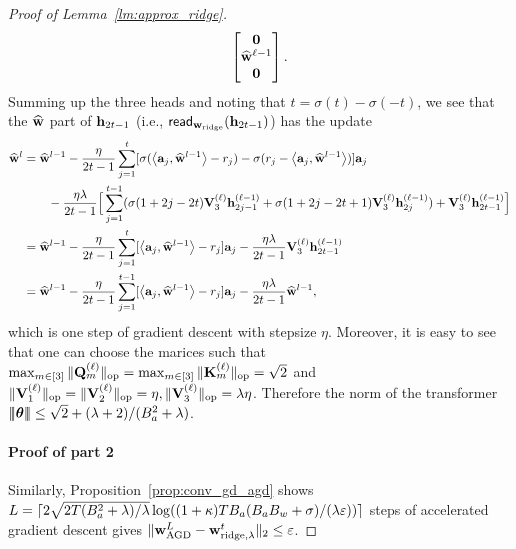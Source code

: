 \begin{proof}[Proof of Lemma~\ref{lm:approx_ridge}]
\begin{align*}
\begin{bmatrix}
        {\mathbf 0}\\ \widehat{{\mathbf w}}^{\ell-1}\\ {\mathbf 0}
    \end{bmatrix}.
\end{align*}
Summing up the three heads and noting that $t=\sigma(t)-\sigma(-t)$, we see that the $\widehat{{\mathbf w}}$ part of ${\mathbf h}_{2t-1}$ (i.e., ${\sf read}_{{\mathbf w}_{\rm ridge}}({\mathbf h}_{2t-1})$) has the update
\begin{align*}
    \widehat{{\mathbf w}}^{l}
    &=\widehat{{\mathbf w}}^{l-1}-\frac{\eta}{2t-1}\sum_{j=1}^t[\sigma(\left\langle{\mathbf a}_j,\widehat{{\mathbf w}}^{l-1}\right\rangle-r_j)-\sigma(r_j-\left\langle{\mathbf a}_j,\widehat{{\mathbf w}}^{l-1}\right\rangle)]{\mathbf a}_j\\&
    \qquad
    -\frac{\eta\lambda}{2t-1}\Big[\sum_{j=1}^{t-1}(\sigma(1+2j-2t){\mathbf V}_3^{(\ell)}{\mathbf h}^{(\ell-1)}_{2j-1}+\sigma(1+2j-2t+1){\mathbf V}_3^{(\ell)}{\mathbf h}^{(\ell-1)}_{2j})+
   {\mathbf V}_3^{(\ell)}{\mathbf h}^{(\ell-1)}_{2t-1}\Big]\\
     &=\widehat{{\mathbf w}}^{l-1}-\frac{\eta}{2t-1}\sum_{j=1}^t[\left\langle{\mathbf a}_j,\widehat{{\mathbf w}}^{l-1}\right\rangle-r_j]{\mathbf a}_j-\frac{\eta\lambda}{2t-1}{\mathbf V}_3^{(\ell)}{\mathbf h}^{(\ell-1)}_{2t-1}\\
     &=\widehat{{\mathbf w}}^{l-1}-\frac{\eta}{2t-1}\sum_{j=1}^{t-1}[\left\langle{\mathbf a}_j,\widehat{{\mathbf w}}^{l-1}\right\rangle-r_j]{\mathbf a}_j-\frac{\eta\lambda}{2t-1}\widehat{{\mathbf w}}^{l-1},
\end{align*}
which is one step of gradient descent with stepsize $\eta$.  Moreover, it is easy to see that one can choose the marices such that $\max_{m\in[3]}\|{{\mathbf Q}^{(\ell)}_m}\|_{\mathrm{op}}=\max_{m\in[3]}\|{{\mathbf K}^{(\ell)}_m}\|_{\mathrm{op}}=\sqrt{2}$ and $\|{{\mathbf V}^{(\ell)}_1}\|_{\mathrm{op}}=\|{{\mathbf V}^{(\ell)}_2}\|_{\mathrm{op}}=\eta,\|{{\mathbf V}^{(\ell)}_3}\|_{\mathrm{op}}= \lambda\eta$. Therefore the norm of the transformer ${\left|\!\left|\!\left|{{\boldsymbol \theta}}\right|\!\right|\!\right|}\leq \sqrt{2}+(\lambda+2)/(B_a^2+\lambda)$.


\paragraph{Proof of part 2}
Similarly,  Proposition~\ref{prop:conv_gd_agd} shows $L=\lceil2\sqrt{2T(B_a^2+\lambda)/\lambda}\log((1+\kappa){TB_a(B_aB_w+\sigma)}/({\lambda}\varepsilon))\rceil$ steps of accelerated gradient descent gives  $\|{\mathbf w}^L_{{\mathrm{AGD}}}-{\mathbf w}^t_{{\rm ridge},\lambda}\|_2\leq\varepsilon$.


\end{proof}
